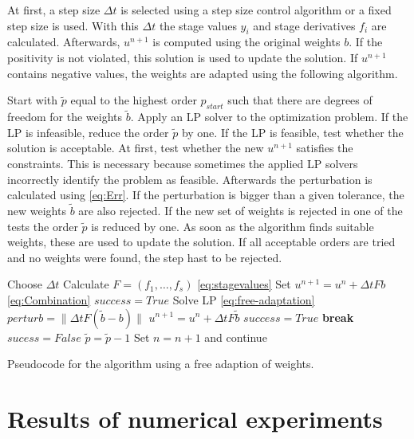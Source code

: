 \documentclass[a4paper]{article}
\numberwithin{equation}{section}
\theoremstyle{plain}
\theoremstyle{definition}
\numberwithin{theorem}{section}
\newcommand{\dt}{{\Delta t}}
\newcommand{\1}{\mathbbm{1}}
\newcommand{\bt}{\tilde{b}}
\newcommand{\pt}{{\tilde{p}}}
\begin{document}
At first, a step size $\dt$ is selected using a step size control algorithm or a fixed step size is used.
With this $\dt$ the stage values $y_i$ and stage derivatives $f_i$ are calculated.
Afterwards, $u^{n+1}$ is computed using the original weights $b$.
If the positivity is not violated, this solution is used to update the solution.
If $u^{n+1}$ contains negative values, the weights are adapted using the following algorithm.

Start with $\pt$ equal to the highest order $p_{start}$ such that there are degrees of freedom for the weights $\bt$.
Apply an LP solver to the optimization
problem.
If the LP is infeasible, reduce the order $\tilde p$ by one.
If the LP is feasible, test whether the solution is acceptable.
At first, test whether the new $u^{n+1}$ satisfies the constraints.
This is necessary because sometimes the applied LP solvers incorrectly
identify the problem as feasible.
Afterwards the perturbation is calculated using \eqref{eq:Err}.
If the perturbation is bigger than a given tolerance, the
new weights $\bt$ are also rejected.
If the new set of weights is rejected in one of the tests the order
$\tilde p$ is reduced by one.
As soon as the algorithm finds suitable weights, these are used to update the solution.
If all acceptable orders are tried and no weights were found, the step hast to be rejected.

\begin{algorithm}[ht]
\begin{algorithmic}[1]
\State Choose $\Delta t$
\State Calculate $F = (f_1, \dots, f_s)$ \eqref{eq:stagevalues}
\State Set $u^{n+1}=u^n + \Delta t Fb$ \eqref{eq:Combination}
	\State $success = True$
\Else
		\State Solve LP \eqref{eq:free-adaptation}
			\State $perturb = \| \Delta t F(\bt-b)\|$
				\State $u^{n+1}=u^n+\Delta t F \tilde b$
				\State $success = True$
				\State \textbf{break}
			\EndIf
		\EndIf
			\State $sucess=False$
		\EndIf
		\State $\tilde p = \tilde p -1$
	\EndWhile
\EndIf
{}
	\State Set $n=n+1$ and continue
\EndIf
\EndWhile
\end{algorithmic}
\caption{Pseudocode for the algorithm using a free adaption of weights.}
\label{alg:Adaption}
\end{algorithm}

\section{Results of numerical experiments}\label{sec:Numeric_Results}
\end{document}
